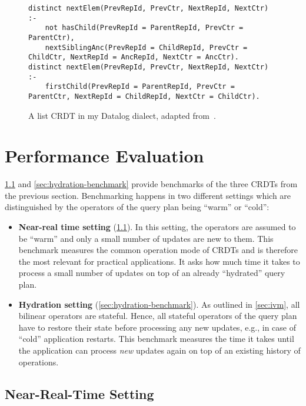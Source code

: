 \begin{figure}[htpb]
\begin{lstlisting}[keepspaces]
distinct nextElem(PrevRepId, PrevCtr, NextRepId, NextCtr) :-
    not hasChild(PrevRepId = ParentRepId, PrevCtr = ParentCtr),
    nextSiblingAnc(PrevRepId = ChildRepId, PrevCtr = ChildCtr, NextRepId = AncRepId, NextCtr = AncCtr).
distinct nextElem(PrevRepId, PrevCtr, NextRepId, NextCtr) :-
    firstChild(PrevRepId = ParentRepId, PrevCtr = ParentCtr, NextRepId = ChildRepId, NextCtr = ChildCtr).\end{lstlisting}
	\caption{A list \ac{CRDT} in my Datalog dialect, adapted from~\cite{kleppmann2018data}.}\label{code:list-crdt-datalog-dialect}
\end{figure}

\section{Performance Evaluation}\label{sec:benchmarks}

\ref{sec:near-real-time-benchmark} and \ref{sec:hydration-benchmark}
provide benchmarks of the three \acp{CRDT} from the previous section.
Benchmarking happens in two different settings which are distinguished by
the operators of the query plan being ``warm'' or ``cold'':

\begin{itemize}
	\item \textbf{Near-real time setting} (\ref{sec:near-real-time-benchmark}).
	      In this setting, the operators are assumed to be ``warm'' and only
	      a small number of updates are new to them.
	      This benchmark measures the common operation mode of \acp{CRDT} and
	      is therefore the most relevant for practical applications. It asks
	      how much time it takes to process a small number of updates on top of
	      an already ``hydrated'' query plan.
	\item \textbf{Hydration setting} (\ref{sec:hydration-benchmark}).
	      As outlined in \ref{sec:ivm}, all bilinear operators are stateful.
	      Hence, all stateful operators of the query plan have to restore
	      their state before processing any new updates, e.g., in case of ``cold''
	      application restarts. This benchmark measures the time it takes
	      until the application can process \emph{new} updates again on top of
	      an existing history of operations.
\end{itemize}

\subsection{Near-Real-Time Setting}\label{sec:near-real-time-benchmark}

